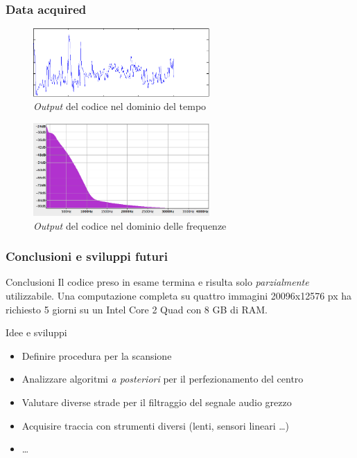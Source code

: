 \begin{frame}
\frametitle{Data acquired}
\begin{figure}
\includegraphics[width=0.6\textwidth]{immagini/gra.png}
\caption{\emph{Output} del codice nel dominio del tempo}
\end{figure}
\begin{figure}
\includegraphics[width=0.6\textwidth]{immagini/freq-domain.png}
\caption{\emph{Output} del codice nel dominio delle frequenze}
\end{figure}
\end{frame}

\begin{frame}
\frametitle{Conclusioni e sviluppi futuri}
\begin{block}{Conclusioni}
Il codice preso in esame termina e risulta solo \emph{parzialmente} utilizzabile.
Una computazione completa su quattro immagini 20096x12576 px ha richiesto 5 giorni su 
un Intel Core 2 Quad con 8 GB di RAM.

\end{block}

\begin{block}{Idee e sviluppi}
\begin{itemize}
\item Definire procedura per la scansione
\item Analizzare algoritmi \emph{a posteriori} per il perfezionamento del centro
\item Valutare diverse strade per il filtraggio del segnale audio grezzo
\item Acquisire traccia con strumenti diversi (lenti, sensori lineari \dots)
\item \dots
\end{itemize}
\end{block}

\end{frame}
